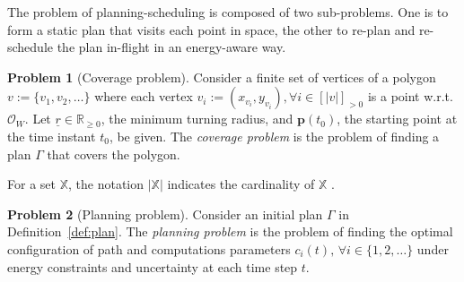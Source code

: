 \documentclass[letterpaper,10pt,journal,twoside]{IEEEtran}
\theoremstyle{definition}
\newtheorem{pb}{Problem}[section]
\begin{document}
The problem of planning-scheduling is composed of two sub-problems. One is to form a static plan that visits each point in space, the other to re-plan and re-schedule the plan in-flight in an energy-aware way.

\begin{pb}[Coverage problem]
  \label{pb:cov-pb}
  Consider a finite set of vertices of a polygon $v:=\{v_1,v_2,\dots\}$ where each vertex $v_i:=(x_{v_i},y_{v_i}),\forall i\in[|v|]_{>0}$
  is a point w.r.t. $\mathcal{O}_W$. Let $\underline{r}\in\mathbb{R}_{\geq 0}$, the minimum turning radius, and $\mathbf{p}(t_0)$, the starting point at the time instant $t_0$, be given. The \emph{coverage problem} is the problem of finding a plan $\Gamma$ that covers the polygon.
\end{pb}    

For a set $\mathbb{X}$, the notation $|\mathbb{X}|$ indicates the cardinality of $\mathbb{X}$%
.

\begin{pb}[Planning problem]
  \label{pb}
  Consider an initial plan $\Gamma$ in Definition~\ref{def:plan}. The \emph{planning problem} is the problem of finding the optimal configuration of path and computations parameters $c_i(t),\,\forall i\in\{1,2,\dots\}$ under energy constraints and uncertainty at each time step $t$.
\end{pb}



\end{document}

